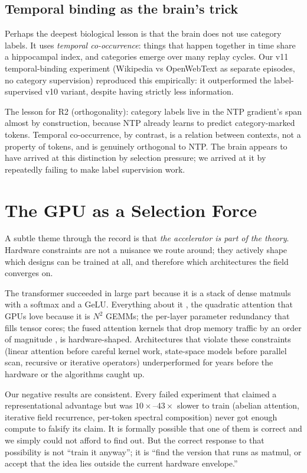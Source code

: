 \documentclass[11pt, a4paper]{article}
\begin{document}
\subsection{Temporal binding as the brain's trick}

Perhaps the deepest biological lesson is that the brain does not use category labels. It uses \emph{temporal co-occurrence}: things that happen together in time share a hippocampal index, and categories emerge over many replay cycles. Our v11 temporal-binding experiment (Wikipedia vs OpenWebText as separate episodes, no category supervision) reproduced this empirically: it outperformed the label-supervised v10 variant, despite having strictly less information.

The lesson for R2 (orthogonality): category labels live in the NTP gradient's span almost by construction, because NTP already learns to predict category-marked tokens. Temporal co-occurrence, by contrast, is a relation between contexts, not a property of tokens, and is genuinely orthogonal to NTP. The brain appears to have arrived at this distinction by selection pressure; we arrived at it by repeatedly failing to make label supervision work.

\section{The GPU as a Selection Force}
\label{sec:gpu}

A subtle theme through the record is that \emph{the accelerator is part of the theory}. Hardware constraints are not a nuisance we route around; they actively shape which designs can be trained at all, and therefore which architectures the field converges on.

The transformer succeeded in large part because it is a stack of dense matmuls with a softmax and a GeLU. Everything about it ,  the quadratic attention that GPUs love because it is $N^2$ GEMMs; the per-layer parameter redundancy that fills tensor cores; the fused attention kernels that drop memory traffic by an order of magnitude ,  is hardware-shaped. Architectures that violate these constraints (linear attention before careful kernel work, state-space models before parallel scan, recursive or iterative operators) underperformed for years before the hardware or the algorithms caught up.

Our negative results are consistent. Every failed experiment that claimed a representational advantage but was $10\times$--$43\times$ slower to train (abelian attention, iterative field recurrence, per-token spectral composition) never got enough compute to falsify its claim. It is formally possible that one of them is correct and we simply could not afford to find out. But the correct response to that possibility is not ``train it anyway''; it is ``find the version that runs as matmul, or accept that the idea lies outside the current hardware envelope.''
\end{document}
